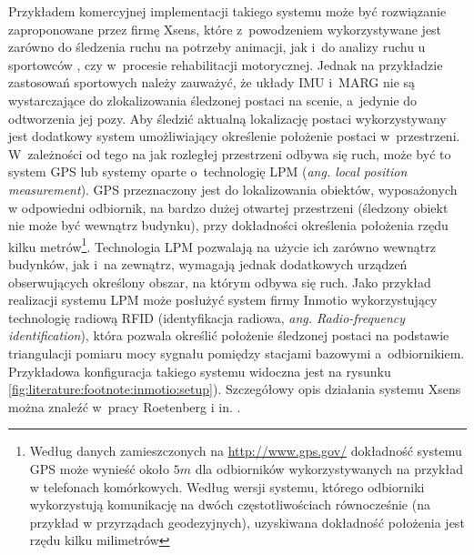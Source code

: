 Przykładem komercyjnej implementacji takiego systemu może być rozwiązanie zaproponowane przez firmę Xsens, które z~powodzeniem wykorzystywane jest zarówno do śledzenia ruchu na potrzeby animacji, jak i~do analizy ruchu u sportowców {}, czy w~procesie rehabilitacji motorycznej. Jednak na przykładzie zastosowań sportowych należy zauważyć, że układy IMU i~MARG nie są wystarczające do zlokalizowania śledzonej postaci na scenie, a~jedynie do odtworzenia jej pozy. Aby śledzić aktualną lokalizację postaci wykorzystywany jest dodatkowy system umożliwiający określenie położenie postaci w~przestrzeni. W~zależności od tego na jak rozległej przestrzeni odbywa się ruch, może być to system GPS lub systemy oparte o~technologię LPM (\emph{ang. local position measurement}). GPS przeznaczony jest do lokalizowania obiektów, wyposażonych w odpowiedni odbiornik, na bardzo dużej otwartej przestrzeni (śledzony obiekt nie może być wewnątrz budynku), przy dokładności określenia położenia rzędu kilku metrów\footnote{Według danych zamieszczonych na \url{http://www.gps.gov/} dokładność systemu GPS może wynieść około $5m$ dla odbiorników wykorzystywanych na przykład w telefonach komórkowych. Według wersji systemu, którego  odbiorniki wykorzystują komunikację na dwóch częstotliwościach równocześnie (na przykład w przyrządach geodezyjnych), uzyskiwana dokładność położenia jest rzędu kilku milimetrów}. Technologia LPM pozwalają na użycie ich zarówno wewnątrz budynków, jak i~na zewnątrz, wymagają jednak dodatkowych urządzeń obserwujących określony obszar, na którym odbywa się ruch. Jako przykład realizacji systemu LPM może posłużyć system firmy Inmotio wykorzystujący technologię radiową RFID (identyfikacja radiowa, \emph{ang. Radio-frequency identification}), która pozwala określić położenie śledzonej postaci na podstawie triangulacji pomiaru mocy sygnału pomiędzy stacjami bazowymi a~odbiornikiem. Przykładowa konfiguracja takiego systemu widoczna jest na rysunku \ref{fig:literature:footnote:inmotio:setup}). Szczegółowy opis działania systemu Xsens można znaleźć w~pracy Roetenberg i in. \cite{Roetenberg2009}.
					
